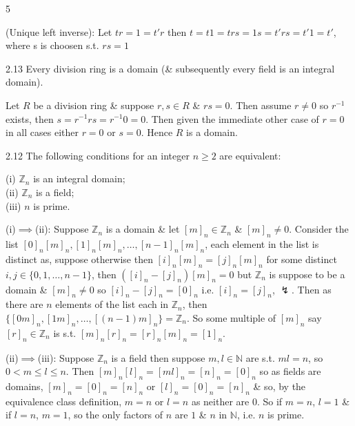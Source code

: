 \documentclass[8pt]{extarticle}
\makeatletter
\renewenvironment{proof}[1][\proofname]{%
  \par%
  \pushQED{\qed}%
  \normalfont
  \topsep=2pt\partopsep=0pt\parsep=0pt\itemsep=0pt%
  \trivlist
  \item[\hskip\labelsep\itshape #1\@addpunct{.}]\ignorespaces
}{%
  \popQED\endtrivlist\@endpefalse
  \vspace{-1pt}%
}
\makeatother
\begin{document}
\begin{multicols}{5}
\begin{proof}
            (Unique left inverse): Let \(tr=1=t'r\) then \(t=t1=trs=1s=t'rs=t'1=t'\), where s is choosen s.t. \(rs=1\)
        \end{proof}

        \begin{proposition}{2.13}
            Every division ring is a domain (\& subsequently every field is an integral domain).
        \end{proposition}

        \begin{proof}
            Let \(R\) be a division ring \& suppose \(r,s\in R\) \& \(rs=0\). Then assume \(r\ne0\) so \(r^{-1}\) exists, then \(s=r^{-1}rs=r^{-1}0=0\). Then given the immediate other case of \(r=0\) in all cases either \(r=0\) or \(s=0\). Hence \(R\) is a domain.
        \end{proof}

        \begin{lemma}{2.12}
            The following conditions for an integer \(n\ge2\) are equivalent:

            (i) \(\mathbb{Z}_n\) is an integral domain;\\
            (ii) \(\mathbb{Z}_n\) is a field;\\
            (iii) \(n\) is prime.
        \end{lemma}

        \begin{proof}
            (i)\(\implies\)(ii):
            Suppose \(\mathbb{Z}_n\) is a domain \& let \([m]_n\in\mathbb{Z}_n\) \& \([m]_n\ne0\). Consider the list \([0]_n[m]_n,[1]_n[m]_n,\ldots,[n-1]_n[m]_n\), each element in the list is distinct as, suppose otherwise then \([i]_n[m]_n=[j]_n[m]_n\) for some distinct \(i,j\in\{0,1,\ldots,n-1\}\), then \(([i]_n-[j]_n)[m]_n=0\) but \(\mathbb{Z}_n\) is suppose to be a domain \& \([m]_n\ne0\) so \([i]_n-[j]_n=[0]_n\) i.e. \([i]_n=[j]_n\), \(\lightning\). Then as there are \(n\) elements of the list each in \(\mathbb{Z}_n\), then \(\{[0m]_n,[1m]_n,\ldots,[(n-1)m]_n\}=\mathbb{Z}_n\). So some multiple of \([m]_n\) say \([r]_n\in\mathbb{Z}_n\) is s.t. \([m]_n[r]_n=[r]_n[m]_n=[1]_n\).

            (ii)\(\implies\)(iii):
            Suppose \(\mathbb{Z}_n\) is a field then suppose \(m,l\in\mathbb{N}\) are s.t. \(ml=n\), so \(0<m\le l\le n\). Then \([m]_n[l]_n=[ml]_n=[n]_n=[0]_n\) so as fields are domains, \([m]_n=[0]_n=[n]_n\) or \([l]_n=[0]_n=[n]_n\) \& so, by the equivalence class definition, \(m=n\) or \(l=n\) as neither are \(0\). So if \(m=n\), \(l=1\) \& if \(l=n\), \(m=1\), so the only factors of \(n\) are \(1\) \& \(n\) in \(\mathbb{N}\), i.e. \(n\) is prime.


\end{proof}
\end{multicols}
\end{document}
